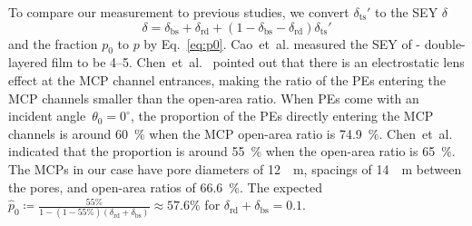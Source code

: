To compare our measurement to previous studies, we convert \(\delta_\text{ts}'\)
to the SEY \(\delta\)
\begin{equation}
	\label{eq:2}
	\delta = \delta_\text{bs} + \delta_\text{rd} + (1-\delta_\text{bs} - \delta_\text{rd}) \delta_\text{ts}'
\end{equation}
and the fraction \(p_0\) to \(p\) by Eq.~\eqref{eq:p0}.
Cao~et~al.\cite{cao_secondary_2021} measured the SEY of - double-layered film
to be 4--5. Chen~et~al.~\cite{2016Optimization} pointed out
that there is an electrostatic lens effect at the MCP channel entrances,
making the ratio of the PEs entering the MCP channels
smaller than the open-area ratio.
When PEs come with an incident angle~$\theta_0=0^\circ$,
the proportion of the PEs directly entering the MCP channels is around \SI{60}{\percent} when the MCP open-area ratio is \SI{74.9}{\percent}.
Chen~et~al.~\cite{chen2018photoelectron} indicated that
the proportion is around \SI{55}{\percent} when the open-area ratio is \SI{65}{\percent}.
The MCPs in our case have pore diameters of \SI{12}{\mu\meter}, spacings of \SI{14}{\mu\meter} between the pores,
and open-area ratios of \SI{66.6}{\percent}.
The expected $\hat{p}_0\coloneqq \frac{55\%}{1-(1-55\%)(\delta_{\mathrm{rd}}+\delta_{\mathrm{bs}})}\approx 57.6\%$ for $\delta_{\mathrm{rd}}+\delta_{\mathrm{bs}}=0.1$.
